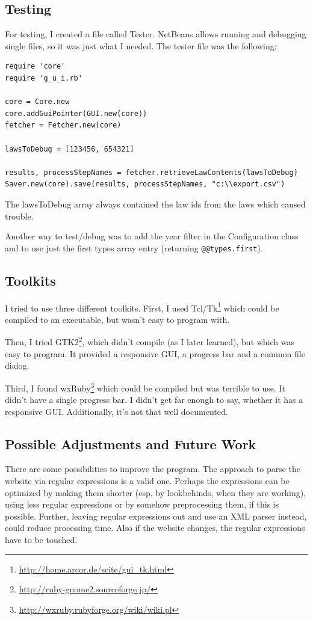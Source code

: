 \documentclass{scrartcl}
\begin{document}
\subsection{Testing}
For testing, I created a file called Tester. NetBeans allows running and debugging single files, so it was just what I needed. The tester file was the following:

\begin{verbatim}
require 'core'
require 'g_u_i.rb'

core = Core.new
core.addGuiPointer(GUI.new(core))
fetcher = Fetcher.new(core)

lawsToDebug = [123456, 654321]

results, processStepNames = fetcher.retrieveLawContents(lawsToDebug)
Saver.new(core).save(results, processStepNames, "c:\\export.csv")
\end{verbatim}
The lawsToDebug array always contained the law ids from the laws which caused trouble.

Another way to test/debug was to add the year filter in the Configuration class and to use just the first types array entry (returning \texttt{@@types.first}).



\subsection{Toolkits}
\label{Toolkits}
I tried to use three different toolkits. First, I used Tcl/Tk\footnote{\url{http://home.arcor.de/scite/gui_tk.html}} which could be compiled to an executable, but wasn't easy to program with.

Then, I tried GTK2\footnote{\url{http://ruby-gnome2.sourceforge.jp/}}, which didn't compile (as I later learned), but which was easy to program. It provided a responsive GUI, a progress bar and a common file dialog.

Third, I found wxRuby\footnote{\url{http://wxruby.rubyforge.org/wiki/wiki.pl}} which could be compiled but was terrible to use. It didn't have a single progress bar. I didn't get far enough to say, whether it has a responsive GUI. Additionally, it's not that well documented.



\subsection{Possible Adjustments and Future Work}
There are some possibilities to improve the program. The approach to parse the website via regular expressions is a valid one. Perhaps the expressions can be optimized by making them shorter (esp. by lookbehinds, when they are working), using less regular expressions or by somehow preprocessing them, if this is possible. Further, leaving regular expressions out and use an XML parser instead, could reduce processing time. Also if the website changes, the regular expressions have to be touched.
\end{document}
